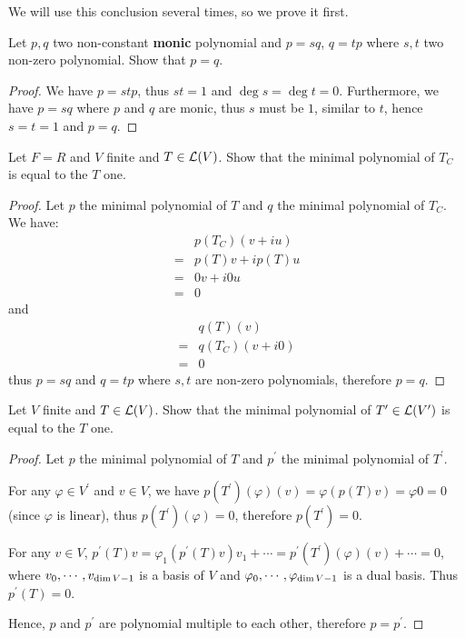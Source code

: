 \documentclass[../main.tex]{subfiles}
\begin{document}
We will use this conclusion several times, so we prove it first.
\begin{exercise*}
  Let $p, q$ two non-constant \textbf{monic} polynomial and $p = sq$, $q = tp$
  where $s, t$ two non-zero polynomial. Show that $p = q$.
\end{exercise*}
\begin{proof}
  We have $p = stp$, thus $st = 1$ and $\deg s = \deg t = 0$.
  Furthermore, we have $p = sq$ where $p$ and $q$ are monic,
  thus $s$ must be $1$, similar to $t$, hence $s = t = 1$ and $p = q$.
\end{proof}

\begin{exercise}
  Let $F = R$ and $V$ finite and $T \in \mathcal{L}(V)$.
  Show that the minimal polynomial of $T_C$ is equal to the $T$ one.
\end{exercise}
\begin{proof}
  Let $p$ the minimal polynomial of $T$ and $q$ the minimal polynomial of $T_C$.
  We have:
  \begin{align*}
     & p(T_C)(v + iu) \\
    =& p(T)v + ip(T)u \\
    =& 0v + i0u \\
    =& 0
  \end{align*}
  and
  \begin{align*}
     & q(T)(v) \\
    =& q(T_C)(v + i0) \\
    =& 0
  \end{align*}
  thus $p = sq$ and $q = tp$ where $s, t$ are non-zero polynomials,
  therefore $p = q$.
\end{proof}

\begin{exercise}
  Let $V$ finite and $T \in \mathcal{L}(V)$. Show that
  the minimal polynomial of $T^\prime \in \mathcal{L}(V^\prime)$
  is equal to the $T$ one.
\end{exercise}
\begin{proof}
  Let $p$ the minimal polynomial of $T$ and $p^\prime$ the minimal polynomial of $T^\prime$.

  For any $\varphi \in V^\prime$ and $v \in V$, we have
  $p(T^\prime)(\varphi)(v) = \varphi (p(T)v) = \varphi0 = 0$ (since $\varphi$ is linear),
  thus $p(T^\prime)(\varphi) = 0$, therefore $p(T^\prime) = 0$.

  For any $v \in V$, $p^\prime(T)v = \varphi_1(p^\prime(T)v)v_1 + \cdots = p^\prime(T^\prime)(\varphi)(v) + \cdots = 0$,
  where $v_0 , \cdots , v_{\dim V - 1}$ is a basis of $V$ and $\varphi_0 , \cdots , \varphi_{\dim V - 1}$ is a dual basis.
  Thus $p^\prime(T) = 0$.

  Hence, $p$ and $p^\prime$ are polynomial multiple to each other, therefore $p = p^\prime$.
\end{proof}
\end{document}
